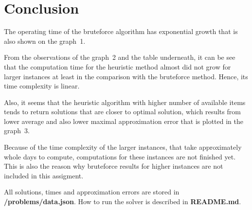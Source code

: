 \documentclass{article}
\begin{document}
		\clearpage
		\begin{figure}[h!]
			\centering

		\end{figure}
\section{Conclusion}
	The operating time of the bruteforce algorithm has exponential growth that is also shown on the graph~1. 

	From the observations of the graph~2 and the table underneath, it can be see that the computation time for the heuristic method almost did not grow for larger instances at least in the comparison with the bruteforce method. Hence, its time complexity is linear.

	Also, it seems that the heuristic algorithm with higher number of available items tends to return solutions that are closer to optimal solution, which results from lower average and also lower maximal approximation error that is plotted in the graph~3.
	
	Because of the time complexity of the larger instances, that take approximately whole days to compute, computations for these instances are not finished yet. This is also the reason why bruteforce results for higher instances are not included in this assigment.
	
	All solutions, times and approximation errors are stored in \textbf{/problems/data.json}. How to run the solver is described in \textbf{README.md}.
\end{document}
